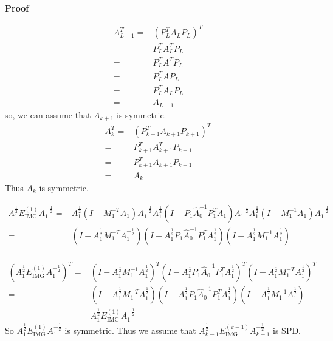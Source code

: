 \documentclass{article}
\begin{document}
\textbf{Proof}

\begin{equation*}\begin{aligned}A_{L-1}^T= & (P_L^TA_LP_L)^T \\
               =          & P_L^TA_L^TP_L   \\
               =          & P_L^TA^TP_L     \\
               =          & P_L^TAP_L       \\
               =          & P_L^TA_LP_L     \\
               =          & A_{L-1}\end{aligned}\end{equation*}
so, we can assume that $A_{k+1}$ is symmetric.
\begin{equation*}
    \begin{aligned}
        A_{k}^T= & (P_{k+1}^TA_{k+1}P_{k+1})^T \\
        =        & P_{k+1}^TA_{k+1}^TP_{k+1}   \\
        =        & P_{k+1}^TA_{k+1}P_{k+1}     \\
        =        & A_{k}
    \end{aligned}
\end{equation*}
Thus $A_k$ is symmetric.

\begin{equation*}
    \begin{aligned}
        A_1^{\frac{1}{2}}E_\text{IMG}^{(1)}A_1^{-\frac{1}{2}}= & A_1^{\frac{1}{2}}(I-M_1^{-T}A_1)A_1^{-\frac{1}{2}} A_1^{\frac{1}{2}}(I-P_1\hat{A}_0^{-1}P_1^TA_1)A_1^{-\frac{1}{2}}A_1^{\frac{1}{2}}(I-M_1^{-1}A_1)A_1^{-\frac{1}{2}} \\
        =                                                      & (I-A_1^{\frac{1}{2}}M_1^{-T}A_1^{-\frac{1}{2}})(I-A_1^{\frac{1}{2}}P_1\hat{A}_0^{-1}P_1^TA_1^{ \frac{1}{2}})(I-A_1^{\frac{1}{2}}M_1^{-1}A_1^{\frac{1}{2}})            \\
    \end{aligned}
\end{equation*}


\begin{equation*}
    \begin{aligned}
        (A_1^{\frac{1}{2}}E_\text{IMG}^{(1)}A_1^{-\frac{1}{2}})^T
        = & (I-A_1^{\frac{1}{2}}M_1^{-1}A_1^{\frac{1}{2}})^T(I-A_1^{\frac{1}{2}}P_1\hat{A}_0^{-1}P_1^TA_1^{\frac{1}{2}})^T(I-A_1^{\frac{1}{2}}M_1^{-T}A_1^{\frac{1}{2}})^T \\
        = & (I-A_1^{\frac{1}{2}}M_1^{-T}A_1^{\frac{1}{2}})(I-A_1^{\frac{1}{2}}P_1\hat{A}_0^{-1}P_1^TA_1^{\frac{1}{2}})(I-A_1^{\frac{1}{2}}M_1^{-1}A_1^{\frac{1}{2}})       \\
        = & A_1^{\frac{1}{2}}E_\text{IMG}^{(1)}A_1^{-\frac{1}{2}}
    \end{aligned}
\end{equation*}
So $A_1^{\frac{1}{2}}E_\text{IMG}^{(1)}A_1^{-\frac{1}{2}}$ is symmetric. Thus we assume that $A_{k-1}^{\frac{1}{2}}E_\text{IMG}^{(k-1)}A_{k-1}^{-\frac{1}{2}}$ is SPD.
\end{document}
